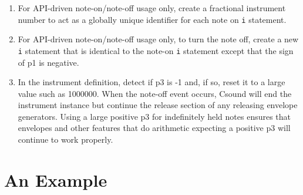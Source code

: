 \documentclass[12pt,letterpaper,onecolumn]{scrartcl}
\begin{document}
\begin{enumerate}
\begin{enumerate}
    \item For API-driven note-on/note-off usage only, create a fractional
    instrument number to act as a globally unique identifier for each note on
\texttt{i} statement.
    \item For API-driven note-on/note-off usage only, to turn the note off,
    create a new \texttt{i} statement that is identical to the note-on
\texttt{i} statement except that the sign of p1 is negative.
    \item In the instrument definition, detect if p3 is -1 and, if so, reset
    it to a large value such as 1000000. When the note-off event occurs,
Csound will end the instrument instance but continue the release section of
any releasing envelope generators. Using a large positive p3 for indefinitely
held notes ensures that envelopes and other features that do arithmetic
expecting a positive p3 will continue to work properly.
\end{enumerate}

\end{enumerate}
\section{An Example}
\label{sec:AnExample}
\end{document}
